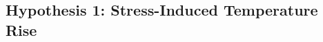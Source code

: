 \subsection{Hypothesis 1: Stress-Induced Temperature Rise}
\label{subsec:Evaluation:Study2:Hypothesis1}

    
    
    

